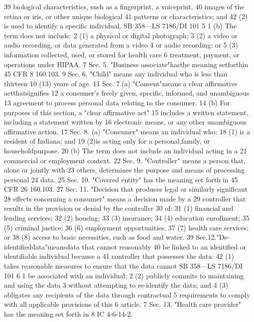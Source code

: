 39 biological characteristics, such as a fingerprint, a voiceprint,
40 images of the retina or iris, or other unique biological
41 patterns or characteristics; and
42 (2) is used to identify a specific individual.
SB 358—LS 7186/DI 101
5
1 (b) The term does not include:
2 (1) a physical or digital photograph;
3 (2) a video or audio recording, or data generated from a video
4 or audio recording; or
5 (3) information collected, used, or stored for health care
6 treatment, payment, or operations under HIPAA.
7 Sec. 5. "Business associate"hasthe meaning setforthin 45 CFR
8 160.103.
9 Sec. 6. "Child" means any individual who is less than thirteen
10 (13) years of age.
11 Sec. 7.(a) "Consent"means a clear affirmative actthatsignifies
12 a consumer's freely given, specific, informed, and unambiguous
13 agreement to process personal data relating to the consumer.
14 (b) For purposes of this section, a "clear affirmative act"
15 includes a written statement, including a statement written by
16 electronic means, or any other unambiguous affirmative action.
17 Sec. 8. (a) "Consumer" means an individual who:
18 (1) is a resident of Indiana; and
19 (2)is acting only for a personal,family, or householdpurpose.
20 (b) The term does not include an individual acting in a
21 commercial or employment context.
22 Sec. 9. "Controller" means a person that, alone or jointly with
23 others, determines the purpose and means of processing personal
24 data.
25 Sec. 10. "Covered entity" has the meaning set forth in 45 CFR
26 160.103.
27 Sec. 11. "Decision that produces legal or similarly significant
28 effects concerning a consumer" means a decision made by a
29 controller that results in the provision or denial by the controller
30 of:
31 (1) financial and lending services;
32 (2) housing;
33 (3) insurance;
34 (4) education enrollment;
35 (5) criminal justice;
36 (6) employment opportunities;
37 (7) health care services; or
38 (8) access to basic necessities, such as food and water.
39 Sec.12."De-identifieddata"meansdata that cannot reasonably
40 be linked to an identified or identifiable individual because a
41 controller that possesses the data:
42 (1) takes reasonable measures to ensure that the data cannot
SB 358—LS 7186/DI 101
6
1 be associated with an individual;
2 (2) publicly commits to maintaining and using the data
3 without attempting to re-identify the data; and
4 (3) obligates any recipients of the data through contractual
5 requirements to comply with all applicable provisions of this
6 article.
7 Sec. 13. "Health care provider" has the meaning set forth in
8 IC 4-6-14-2.
